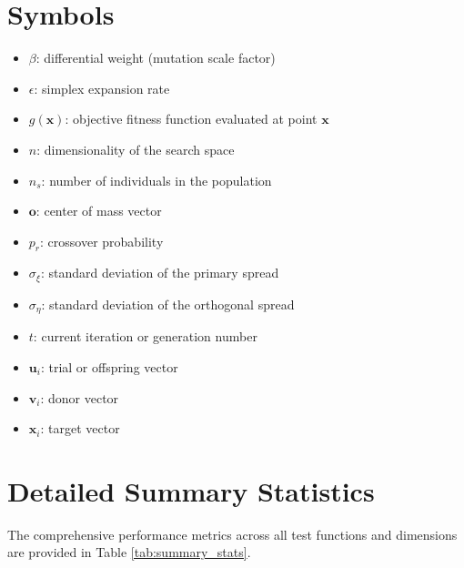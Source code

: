 \documentclass[conference]{IEEEtran}
\begin{document}
\section{Symbols}
\begin{itemize}
    \item $\beta$: differential weight (mutation scale factor)
    \item $\epsilon$: simplex expansion rate
    \item $g(\mathbf{x})$: objective fitness function evaluated at point $\mathbf{x}$
    \item $n$: dimensionality of the search space
    \item $n_s$: number of individuals in the population
    \item $\mathbf{o}$: center of mass vector
    \item $p_r$: crossover probability
    \item $\sigma_\xi$: standard deviation of the primary spread
    \item $\sigma_\eta$: standard deviation of the orthogonal spread
    \item $t$: current iteration or generation number
    \item $\mathbf{u}_i$: trial or offspring vector
    \item $\mathbf{v}_i$: donor vector
    \item $\mathbf{x}_i$: target vector
\end{itemize}

\section{Detailed Summary Statistics}
The comprehensive performance metrics across all test functions and dimensions are provided in Table \ref{tab:summary_stats}.

\begin{table}[htbp]
    \caption{Summary Statistics (Final Best Fitness over 30 Runs after 3000 Iterations)}
    \label{tab:summary_stats}
    \centering
    
\end{table}
\end{document}
